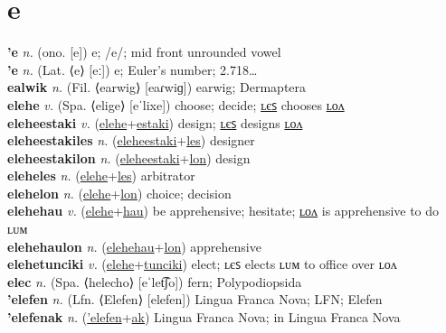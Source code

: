 

\section{e}

\textbf{'e} \textit{n.} (ono. [e])
e; /e/; mid front unrounded vowel \label{'e} \\
\textbf{'e} \textit{n.} (Lat. ⟨e⟩ [eː])
e; Euler’s number; 2.718… \label{'e} \\
\textbf{ealwik} \textit{n.} (Fil. ⟨earwig⟩ [eaɾwiɡ])
earwig; Dermaptera \label{ealwik} \\
\textbf{elehe} \textit{v.} (Spa. ⟨elige⟩ [eˈlixe])
choose; decide; \hyperref[eleheles]{ʟєꜱ} chooses \hyperref[elehelon]{ʟᴏᴧ} \label{elehe} \\
\textbf{eleheestaki} \textit{v.} (\hyperref[elehe]{elehe}+\hyperref[estaki]{estaki})
design; \hyperref[eleheestakiles]{ʟєꜱ} designs \hyperref[eleheestakilon]{ʟᴏᴧ} \label{eleheestaki} \\
\textbf{eleheestakiles} \textit{n.} (\hyperref[eleheestaki]{eleheestaki}+\hyperref[les]{les})
designer \label{eleheestakiles} \\
\textbf{eleheestakilon} \textit{n.} (\hyperref[eleheestaki]{eleheestaki}+\hyperref[lon]{lon})
design \label{eleheestakilon} \\
\textbf{eleheles} \textit{n.} (\hyperref[elehe]{elehe}+\hyperref[les]{les})
arbitrator \label{eleheles} \\
\textbf{elehelon} \textit{n.} (\hyperref[elehe]{elehe}+\hyperref[lon]{lon})
choice; decision \label{elehelon} \\
\textbf{elehehau} \textit{v.} (\hyperref[elehe]{elehe}+\hyperref[hau]{hau})
be apprehensive; hesitate; \hyperref[elehehaulon]{ʟᴏᴧ} is apprehensive to do ʟᴜᴍ \label{elehehau} \\
\textbf{elehehaulon} \textit{n.} (\hyperref[elehehau]{elehehau}+\hyperref[lon]{lon})
apprehensive \label{elehehaulon} \\
\textbf{elehetunciki} \textit{v.} (\hyperref[elehe]{elehe}+\hyperref[tunciki]{tunciki})
elect; ʟєꜱ elects ʟᴜᴍ to office over ʟᴏᴧ \label{elehetunciki} \\
\textbf{elec} \textit{n.} (Spa. ⟨helecho⟩ [eˈlet͡ʃo])
fern; Polypodiopsida \label{elec} \\
\textbf{'elefen} \textit{n.} (Lfn. ⟨Elefen⟩ [elefen])
Lingua Franca Nova; LFN; Elefen \label{'elefen} \\
\textbf{'elefenak} \textit{n.} (\hyperref['elefen]{'elefen}+\hyperref[ak]{ak})
Lingua Franca Nova; in Lingua Franca Nova \label{'elefenak} \\
